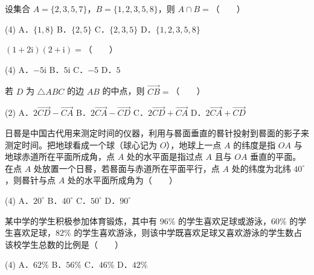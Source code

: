 \begin{question}
设集合 $A=\{2,3,5,7\}$，$B=\{1,2,3,5,8\}$，则 $A\cap B=$\mbox{（　　）}

\begin{gkopts}(4)
\task A．$\{1,8\}$
\task B．$\{2,5\}$
\task C．$\{2,3,5\}$
\task D．$\{1,2,3,5,8\}$
\end{gkopts}

\end{question}
\begin{question}
$(1+2\mathrm i)(2+\mathrm i)=$\mbox{（　　）}

\begin{gkopts}(4)
\task A．$-5\mathrm i$
\task B．$5\mathrm i$
\task C．$-5$
\task D．$5$
\end{gkopts}

\end{question}
\begin{question}
若 $D$ 为 $\triangle ABC$ 的边 $AB$ 的中点，则 $\overrightarrow{CB}=$\mbox{（　　）}

\begin{gkopts}(2)
\task A．$2\overrightarrow{CD}-\overrightarrow{CA}$
\task B．$2\overrightarrow{CA}-\overrightarrow{CD}$
\task C．$2\overrightarrow{CD}+\overrightarrow{CA}$
\task D．$2\overrightarrow{CA}+\overrightarrow{CD}$
\end{gkopts}

\end{question}
\begin{question}
日晷是中国古代用来测定时间的仪器，利用与晷面垂直的晷针投射到晷面的影子来测定时间。把地球看成一个球（球心记为 $O$），地球上一点 $A$ 的纬度是指 $OA$ 与地球赤道所在平面所成角，点 $A$ 处的水平面是指过点 $A$ 且与 $OA$ 垂直的平面。在点 $A$ 处放置一个日晷，若晷面与赤道所在平面平行，点 $A$ 处的纬度为北纬 $40^\circ$，则晷针与点 $A$ 处的水平面所成角为\mbox{（　　）}

\begin{gkopts}(4)
\task A．$20^\circ$
\task B．$40^\circ$
\task C．$50^\circ$
\task D．$90^\circ$
\end{gkopts}

\end{question}
\begin{question}
某中学的学生积极参加体育锻炼，其中有 $96\%$ 的学生喜欢足球或游泳，$60\%$ 的学生喜欢足球，$82\%$ 的学生喜欢游泳，则该中学既喜欢足球又喜欢游泳的学生数占该校学生总数的比例是\mbox{（　　）}

\begin{gkopts}(4)
\task A．$62\%$
\task B．$56\%$
\task C．$46\%$
\task D．$42\%$
\end{gkopts}

\end{question}
